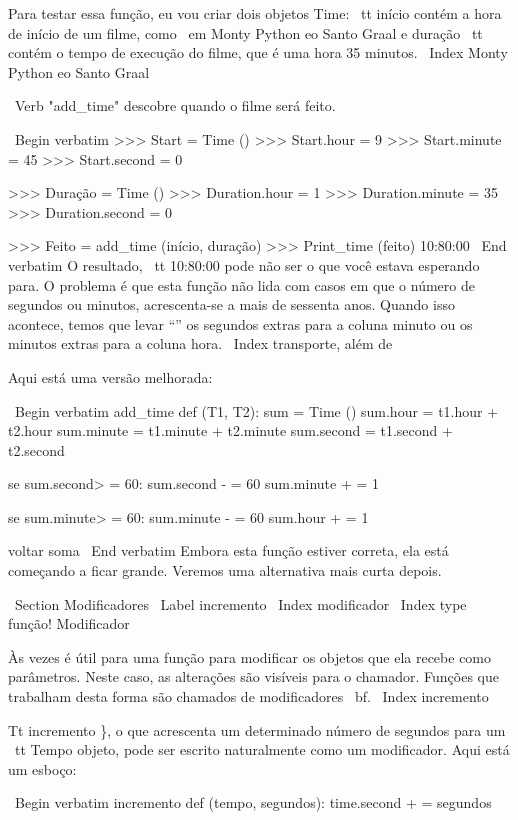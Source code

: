 \documentclass[10pt]{book}
\begin{document}
{{{{{{{{{{{{{Para testar essa função, eu vou criar dois objetos Time: {\ tt início}
contém a hora de início de um filme, como {\ em Monty Python eo
Santo Graal} e {duração \ tt} contém o tempo de execução do filme,
que é uma hora 35 minutos.
\ Index {Monty Python eo Santo Graal}

\ Verb "add_time" descobre quando o filme será feito.

\ Begin {verbatim}
>>> Start = Time ()
>>> Start.hour = 9
>>> Start.minute = 45
>>> Start.second = 0

>>> Duração = Time ()
>>> Duration.hour = 1
>>> Duration.minute = 35
>>> Duration.second = 0

>>> Feito = add_time (início, duração)
>>> Print_time (feito)
10:80:00
\ End {verbatim}
%
O resultado, {\ tt 10:80:00} pode não ser o que você estava esperando
para. O problema é que esta função não lida com casos em que o
número de segundos ou minutos, acrescenta-se a mais de sessenta anos. Quando isso
acontece, temos que levar ``'' os segundos extras para a coluna minuto
ou os minutos extras para a coluna hora.
\ Index {transporte, além de}

Aqui está uma versão melhorada:

\ Begin {verbatim}
add_time def (T1, T2):
    sum = Time ()
    sum.hour = t1.hour + t2.hour
    sum.minute = t1.minute + t2.minute
    sum.second = t1.second + t2.second

    se sum.second> = 60:
        sum.second - = 60
        sum.minute + = 1

    se sum.minute> = 60:
        sum.minute - = 60
        sum.hour + = 1

    voltar soma
\ End {verbatim}
%
Embora esta função estiver correta, ela está começando a ficar grande.
Veremos uma alternativa mais curta depois.


\ Section {} Modificadores
\ Label {incremento}
\ Index {} modificador
\ Index {type função! Modificador}

Às vezes é útil para uma função para modificar os objetos que ela recebe como
parâmetros. Neste caso, as alterações são visíveis para o chamador.
Funções que trabalham desta forma são chamados de modificadores {\ bf}.
\ Index {incremento}

{Tt incremento \}, o que acrescenta um determinado número de segundos para um {\ tt Tempo}
objeto, pode ser escrito naturalmente como um
modificador. Aqui está um esboço:

\ Begin {verbatim}
incremento def (tempo, segundos):
    time.second + = segundos

}}}}}}}}}}}}}}
\end{document}
